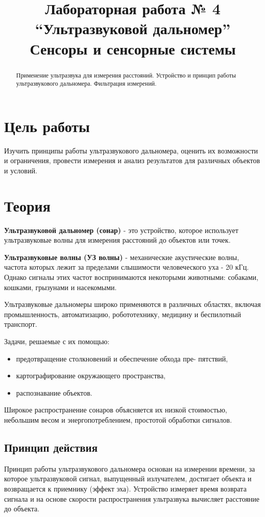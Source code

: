 \documentclass[12pt]{article}
\title{Лабораторная работа № 4 \\
``Ультразвуковой дальномер'' \\
\large Сенсоры и сенсорные системы}
\begin{document}
\maketitle
\tableofcontents
\begin{abstract}
    Применение ультразвука для измерения расстояний. Устройство и принцип работы ультразвукового дальномера. Фильтрация измерений.
\end{abstract}

\section{Цель работы}
Изучить принципы работы ультразвукового дальномера, оценить их возможности и ограничения, провести измерения и анализ результатов для различных объектов и условий.

\section{Теория}
\textbf{Ультразвуковой дальномер (сонар)} - это устройство, которое использует ультразвуковые волны для измерения расстояний до объектов или точек. 

\textbf{Ультразвуковые волны (УЗ волны)} - механические акустические волны, частота которых лежит за пределами слышимости человеческого уха - 20 кГц. Однако сигналы этих частот воспринимаются некоторыми животными: собаками, кошками, грызунами и насекомыми.

Ультразвуковые дальномеры широко применяются в различных областях, включая промышленность, автоматизацию, робототехнику, медицину и беспилотный транспорт.

Задачи, решаемые с их помощью:
\begin{itemize}
	\item предотвращение столкновений и обеспечение обхода пре-
	пятствий,
	\item картографирование окружающего пространства,
	\item распознавание объектов.
\end{itemize}

Широкое распространение сонаров объясняется их низкой стоимостью, небольшим весом и энергопотреблением, простотой обработки сигналов.

\subsection{Принцип действия}
 Принцип работы ультразвукового дальномера основан на измерении времени, за которое ультразвуковой сигнал, выпущенный излучателем, достигает объекта и возвращается к приемнику (эффект эха). Устройство измеряет время возврата сигнала и на основе скорости распространения ультразвука вычисляет расстояние до объекта. 
 
\end{document}
